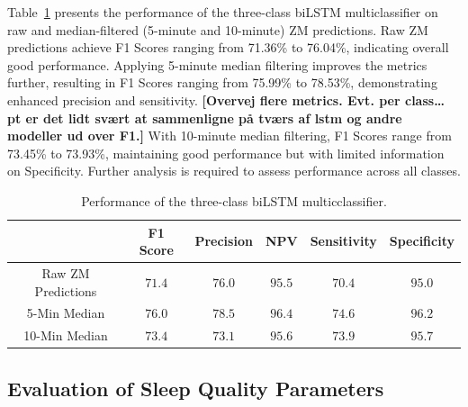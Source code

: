 \documentclass[
  super,
  preprint,
  3p]{elsarticle}
\begin{document}
Table~\ref{tbl-biLSTM_performance} presents the performance of the
three-class biLSTM multiclassifier on raw and median-filtered (5-minute
and 10-minute) ZM predictions. Raw ZM predictions achieve F1 Scores
ranging from 71.36\% to 76.04\%, indicating overall good performance.
Applying 5-minute median filtering improves the metrics further,
resulting in F1 Scores ranging from 75.99\% to 78.53\%, demonstrating
enhanced precision and sensitivity. \textbf{{[}Overvej flere metrics.
Evt. per class\ldots{} pt er det lidt svært at sammenligne på tværs af
lstm og andre modeller ud over F1.{]}} With 10-minute median filtering,
F1 Scores range from 73.45\% to 73.93\%, maintaining good performance
but with limited information on Specificity. Further analysis is
required to assess performance across all classes.

\hypertarget{tbl-biLSTM_performance}{}
\begin{longtable}{cccccc}
\caption{\label{tbl-biLSTM_performance}Performance of the three-class biLSTM multicclassifier. }\tabularnewline

\toprule
 & F1 Score & Precision & NPV & Sensitivity & Specificity \\ 
\midrule
Raw ZM Predictions & $71.4$ & $76.0$ & $95.5$ & $70.4$ & $95.0$ \\ 
5-Min Median & $76.0$ & $78.5$ & $96.4$ & $74.6$ & $96.2$ \\ 
10-Min Median & $73.4$ & $73.1$ & $95.6$ & $73.9$ & $95.7$ \\ 
\bottomrule
\end{longtable}

\hypertarget{evaluation-of-sleep-quality-parameters}{%
\subsection{Evaluation of Sleep Quality
Parameters}\label{evaluation-of-sleep-quality-parameters}}
\end{document}
